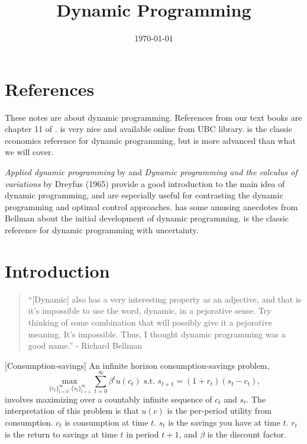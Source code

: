  

\title{Dynamic Programming}
\date{\today}



\maketitle

\section{References}

These notes are about dynamic programming.  References from our text
books are chapter 11 of \cite{dixit1990}. \cite{adda2003} is very nice
and available online from UBC library.  \cite{stokey1989} is the
classic economics reference for dynamic programming, but is more
advanced than what we will cover. 

\textit{Applied dynamic programming} by \cite{bellman1962} and
\textit{Dynamic programming and the calculus of variations} by Dreyfus
(1965) provide a good introduction to the main idea of dynamic
programming, and are especially useful for contrasting the dynamic
programming and optimal control approaches.  \cite{dreyfus2002} has
some amusing anecdotes from Bellman about the initial development of
dynamic programming.  \cite{bertsekas1976} is
the classic reference for dynamic programming with uncertainty.

\section{Introduction}

\begin{quotation}
  ``[Dynamic] also has a very interesting property as an adjective, and
  that is it’s impossible to use the word, dynamic, in a pejorative
  sense. Try thinking of some combination that will possibly give it a
  pejorative meaning.  It’s impossible. Thus, I thought dynamic
  programming was a good name.'' - Richard Bellman
\end{quotation}


\begin{example}\label{ex:consav}[Consumption-savings]
  An infinite horizon consumption-savings problem, 
  \[ \max_{\{c_t\}_{t=0}^\infty,\{s_t\}_{t=1}^\infty} \sum_{t=0}^\infty
  \beta^t u(c_t) \text{ s.t. } s_{t+1} = (1+r_t)(s_t - c_t), \]  
  involves maximizing over a countably infinite sequence of $c_t$ and
  $s_t$. The interpretation of this problem is that $u(c)$ is the
  per-period utility from consumption. $c_t$ is consumption at time
  $t$. $s_t$ is the savings you have at time $t$. $r_t$ is the return to
  savings at time $t$ in period $t+1$, and $\beta$ is the discount
  factor. 
\end{example}

